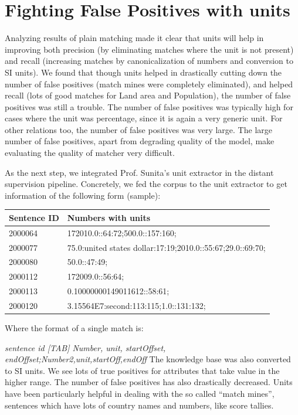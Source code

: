 \documentclass[a4paper,10pt]{article}
\begin{document}
\section{Fighting False Positives with units}
Analyzing results of plain matching made it clear that units will help in improving both precision
(by eliminating matches where the unit is not present) and recall (increasing matches by
canonicalization of numbers and conversion to SI units). We found that though units helped in
drastically cutting down the number of false positives (match mines were completely eliminated),
and helped recall (lots of good matches for Land area and Population), the number of false positives
was still a trouble. The number of false positives was typically high for cases where the unit was
percentage, since it is again a very generic unit. For other relations too, the number of false
positives was very large. The large number of false positives, apart from degrading quality of the
model, make evaluating the quality of matcher very difficult.

As the next step, we integrated Prof. Sunita's unit extractor in the distant supervision pipeline.
Concretely, we fed the corpus to the unit extractor to get information of the following form
(sample):
\begin{center}
 
\begin{tabular}{|l|l|}
\hline
Sentence ID & Numbers with units \\
\hline
2000064&172010.0::64:72;500.0::157:160;\\
2000077&75.0:united states dollar:17:19;2010.0::55:67;29.0::69:70;\\
2000080&50.0::47:49;\\
2000112&172009.0::56:64;\\
2000113&0.10000000149011612::58:61;\\
2000120&3.15564E7:second:113:115;1.0::131:132;\\
\hline
\end{tabular}

\end{center}

Where the format of a single match is:

\emph{sentence id [TAB] Number, unit, startOffset, endOffset;Number2,unit,startOff,endOff}
The knowledge base was also converted to SI units.
We see lots of true positives for attributes that take value in the higher range. The number of false
positives has also drastically decreased. Units have been particularly helpful in dealing with the so
called “match mines”, sentences which have lots of country names and numbers, like score tallies.
\end{document}
